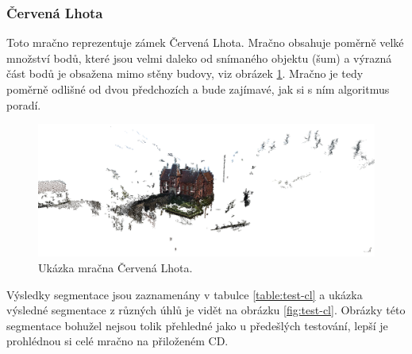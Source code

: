 \documentclass[11pt,twoside,a4paper]{book}
\begin{document}
\cleardoublepage
\subsubsection{Červená Lhota}

Toto mračno reprezentuje zámek Červená Lhota. Mračno obsahuje poměrně velké množství bodů, které jsou velmi daleko od snímaného objektu (šum) a výrazná část bodů je obsažena mimo stěny budovy, viz obrázek \ref{fig:cervena-lhota}. Mračno je tedy poměrně odlišné od dvou předchozích a bude zajímavé, jak si s ním algoritmus poradí.

\begin{figure}[H]
\begin{center}
\includegraphics[width=\textwidth]{figures/cervena-lhota}
\caption{Ukázka mračna Červená Lhota.}
\label{fig:cervena-lhota}
\end{center}
\end{figure}

Výsledky segmentace jsou zaznamenány v tabulce \ref{table:test-cl} a ukázka výsledné segmentace z různých úhlů je vidět na obrázku \ref{fig:test-cl}. Obrázky této segmentace bohužel nejsou tolik přehledné jako u předešlých testování, lepší je prohlédnou si celé mračno na přiloženém CD.
\end{document}
